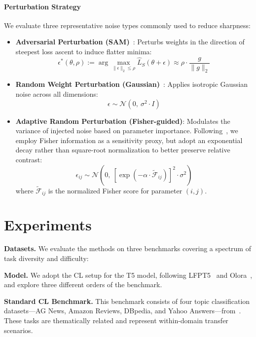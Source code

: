 \documentclass[letterpaper]{article} %
\begin{document}
\paragraph{Perturbation Strategy} We evaluate three representative noise types commonly used to reduce sharpness:

\begin{itemize}
    \item \textbf{Adversarial Perturbation (SAM)}~\cite{foretSharpnessAwareMinimizationEfficiently2021}: Perturbs weights in the direction of steepest loss ascent to induce flatter minima:
    $$
    \epsilon^*(\theta, \rho) := \arg \max_{\|\epsilon\|_2 \leq \rho} \hat{L}_S(\theta + \epsilon) \approx \rho \cdot \frac{g}{\|g\|_2}
    $$

    \item \textbf{Random Weight Perturbation (Gaussian)}~\cite{pmlr-v151-bisla22a}: Applies isotropic Gaussian noise across all dimensions:
    $$
    \epsilon \sim \mathcal{N}(0,\ \sigma^2 \cdot I)
    $$

    \item \textbf{Adaptive Random Perturbation (Fisher-guided)}: Modulates the variance of injected noise based on parameter importance. Following~\cite{liRevisitingRandomWeight2024}, we employ Fisher information as a sensitivity proxy, but adopt an exponential decay rather than square-root normalization to better preserve relative contrast:
    $$
    \epsilon_{ij} \sim \mathcal{N}\left(0,\ \left[\exp\left(-\alpha \cdot \tilde{\mathcal{F}}_{ij} \right)\right]^2 \cdot \sigma^2 \right)
    $$
    where $\tilde{\mathcal{F}}_{ij}$ is the normalized Fisher score for parameter $(i,j)$.
\end{itemize}


\section{Experiments}

\textbf{Datasets.}
We evaluate the methods on three benchmarks covering a spectrum of task diversity and difficulty:


\textbf{Model.} We adopt the CL setup for the T5 model, following LFPT5~\cite{qin2022lfpt5unifiedframeworklifelong} and Olora~\cite{wang2023orthogonal}, and explore three different orders of the benchmark.


\textbf{Standard CL Benchmark.}  
This benchmark consists of four topic classification datasets—AG News, Amazon Reviews, DBpedia, and Yahoo Answers—from~\cite{NIPS2015_250cf8b5}. These tasks are thematically related and represent within-domain transfer scenarios. 
\end{document}
